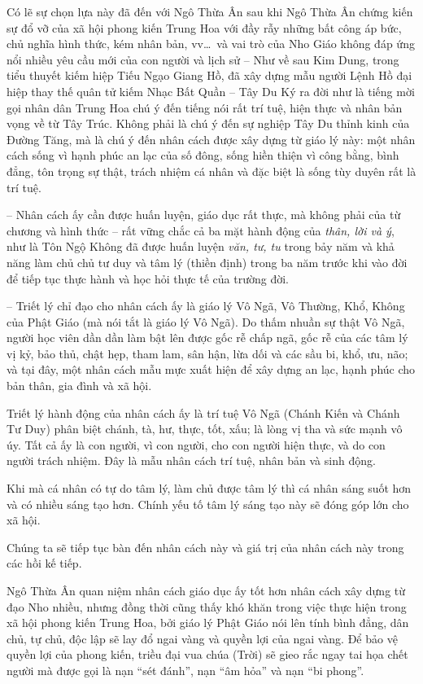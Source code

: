 Có lẽ sự chọn lựa này đã đến với Ngô Thừa Ân sau khi Ngô Thừa Ân chứng kiến sự đổ vỡ của xã hội phong kiến Trung Hoa với đầy rẫy những bất công áp bức, chủ nghĩa hình thức, kém nhân bản, vv\ldots ~và vai trò của Nho Giáo không đáp ứng nổi nhiều yêu cầu mới của con người và lịch sử -- Như về sau Kim Dung, trong tiểu thuyết kiếm hiệp Tiếu Ngạo Giang Hồ, đã xây dựng mẫu người Lệnh Hồ đại hiệp thay thế quân tử kiếm Nhạc Bất Quần -- Tây Du Ký ra đời như là tiếng mời gọi nhân dân Trung Hoa chú ý đến tiếng nói rất trí tuệ, hiện thực và nhân bản vọng về từ Tây Trúc. Không phải là chú ý đến sự nghiệp Tây Du thỉnh kinh của Đường Tăng, mà là chú ý đến nhân cách được xây dựng từ giáo lý này: một nhân cách sống vì hạnh phúc an lạc của số đông, sống hiền thiện vì công bằng, bình đẳng, tôn trọng sự thật, trách nhiệm cá nhân và đặc biệt là sống tùy duyên rất là trí tuệ.

-- Nhân cách ấy cần được huấn luyện, giáo dục rất thực, mà không phải của từ chương và hình thức -- rất vững chắc cả ba mặt hành động của \emph{thân, lời và ý}, như là Tôn Ngộ Không đã được huấn luyện \emph{văn, tư, tu} trong bảy năm và khả năng làm chủ chủ tư duy và tâm lý (thiền định) trong ba năm trước khi vào đời để tiếp tục thực hành và học hỏi thực tế của trường đời.

-- Triết lý chỉ đạo cho nhân cách ấy là giáo lý Vô Ngã, Vô Thường, Khổ, Không của Phật Giáo (mà nói tắt là giáo lý Vô Ngã). Do thấm nhuần sự thật Vô Ngã, người học viên dần dần làm bật lên được gốc rễ chấp ngã, gốc rễ của các tâm lý vị kỷ, bảo thủ, chật hẹp, tham lam, sân hận, lừa dối và các sầu bi, khổ, ưu, não; và tại đây, một nhân cách mẫu mực xuất hiện để xây dựng an lạc, hạnh phúc cho bản thân, gia đình và xã hội.

Triết lý hành động của nhân cách ấy là trí tuệ Vô Ngã (Chánh Kiến và Chánh Tư Duy) phân biệt chánh, tà, hư, thực, tốt, xấu; là lòng vị tha và sức mạnh vô úy. Tất cả ấy là con người, vì con người, cho con người hiện thực, và do con người trách nhiệm. Đây là mẫu nhân cách trí tuệ, nhân bản và sinh động.

Khi mà cá nhân có tự do tâm lý, làm chủ được tâm lý thì cá nhân sáng suốt hơn và có nhiều sáng tạo hơn. Chính yếu tố tâm lý sáng tạo này sẽ đóng góp lớn cho xã hội.

Chúng ta sẽ tiếp tục bàn đến nhân cách này và giá trị của nhân cách này trong các hồi kế tiếp.

Ngô Thừa Ân quan niệm nhân cách giáo dục ấy tốt hơn nhân cách xây dựng từ đạo Nho nhiều, nhưng đồng thời cũng thấy khó khăn trong việc thực hiện trong xã hội phong kiến Trung Hoa, bởi giáo lý Phật Giáo nói lên tính bình đẳng, dân chủ, tự chủ, độc lập sẽ lay đổ ngai vàng và quyền lợi của ngai vàng. Để bảo vệ quyền lợi của phong kiến, triều đại vua chúa (Trời) sẽ gieo rắc ngay tai họa chết người mà được gọi là nạn ``sét đánh'', nạn ``âm hỏa'' và nạn ``bi phong''.

